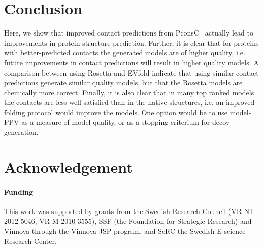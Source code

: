 \documentclass{bioinfo}
\begin{document}
\section{Conclusion}


Here, we show that improved contact predictions from
PconsC~\cite{skwark_PconsC:_2013} actually lead to improvements in
protein structure prediction. Further, it is clear that for proteins
with better-predicted contacts the generated models are of higher
quality, i.e. future improvements in contact predictions will result
in higher quality models. A comparison between using Rosetta and
EVfold indicate that using similar contact predictions generate
similar quality models, but that the Rosetta models are chemically
more correct. Finally, it is also clear that in many top ranked models
the contacts are less well satisfied than in the native structures,
i.e. an improved folding protocol would improve the models.  One
option would be to use model-PPV as a measure of model quality, or as
a stopping criterium for decoy generation.







\section*{Acknowledgement}

\paragraph{Funding\textcolon} %
This work was supported by grants from the Swedish
Research Council (VR-NT 2012-5046, VR-M 2010-3555), SSF (the Foundation for
Strategic Research) and Vinnova through the Vinnova-JSP program,  and SeRC the
Swedish E-science Research Center.


%
%
%
%
%
%
%

\end{document}
